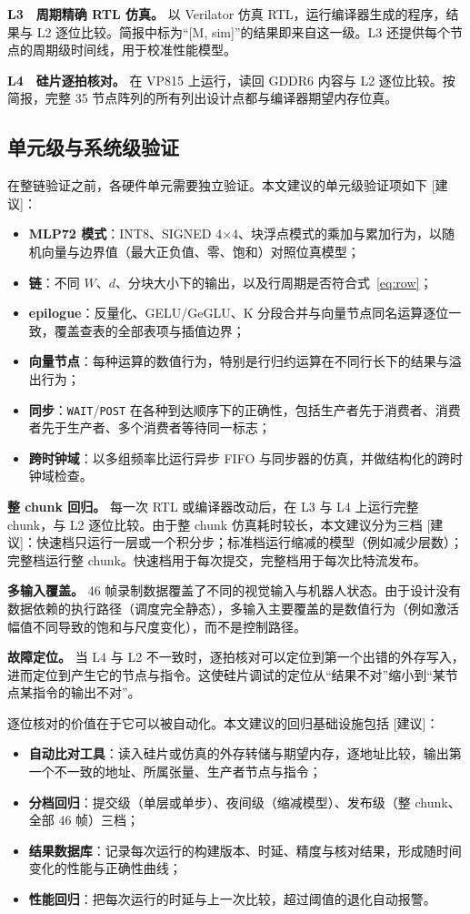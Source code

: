 \documentclass[a4paper,10.5pt]{ctexart}
\newcommand{\tR}{\textsf{[建议]}}           %
\begin{document}
\textbf{L3　周期精确 RTL 仿真。} 以 Verilator 仿真 RTL，运行编译器生成的程序，结果与 L2 逐位比较。简报中标为“[M, sim]”的结果即来自这一级。L3 还提供每个节点的周期级时间线，用于校准性能模型。

\textbf{L4　硅片逐拍核对。} 在 VP815 上运行，读回 GDDR6 内容与 L2 逐位比较。按简报，完整 35 节点阵列的所有列出设计点都与编译器期望内存位真。

\subsection{单元级与系统级验证}

在整链验证之前，各硬件单元需要独立验证。本文建议的单元级验证项如下 \tR：
\begin{itemize}
  \item \textbf{MLP72 模式}：INT8、SIGNED 4$\times$4、块浮点模式的乘加与累加行为，以随机向量与边界值（最大正负值、零、饱和）对照位真模型；
  \item \textbf{链}：不同 $W$、$d$、分块大小下的输出，以及行周期是否符合式~\eqref{eq:row}；
  \item \textbf{epilogue}：反量化、GELU/GeGLU、K 分段合并与向量节点同名运算逐位一致，覆盖查表的全部表项与插值边界；
  \item \textbf{向量节点}：每种运算的数值行为，特别是行归约运算在不同行长下的结果与溢出行为；
  \item \textbf{同步}：\texttt{WAIT}/\texttt{POST} 在各种到达顺序下的正确性，包括生产者先于消费者、消费者先于生产者、多个消费者等待同一标志；
  \item \textbf{跨时钟域}：以多组频率比运行异步 FIFO 与同步器的仿真，并做结构化的跨时钟域检查。
\end{itemize}

\textbf{整 chunk 回归。} 每一次 RTL 或编译器改动后，在 L3 与 L4 上运行完整 chunk，与 L2 逐位比较。由于整 chunk 仿真耗时较长，本文建议分为三档 \tR：快速档只运行一层或一个积分步；标准档运行缩减的模型（例如减少层数）；完整档运行整 chunk。快速档用于每次提交，完整档用于每次比特流发布。

\textbf{多输入覆盖。} 46 帧录制数据覆盖了不同的视觉输入与机器人状态。由于设计没有数据依赖的执行路径（调度完全静态），多输入主要覆盖的是数值行为（例如激活幅值不同导致的饱和与尺度变化），而不是控制路径。

\textbf{故障定位。} 当 L4 与 L2 不一致时，逐拍核对可以定位到第一个出错的外存写入，进而定位到产生它的节点与指令。这使硅片调试的定位从“结果不对”缩小到“某节点某指令的输出不对”。

逐位核对的价值在于它可以被自动化。本文建议的回归基础设施包括 \tR：
\begin{itemize}
  \item \textbf{自动比对工具}：读入硅片或仿真的外存转储与期望内存，逐地址比较，输出第一个不一致的地址、所属张量、生产者节点与指令；
  \item \textbf{分档回归}：提交级（单层或单步）、夜间级（缩减模型）、发布级（整 chunk、全部 46 帧）三档；
  \item \textbf{结果数据库}：记录每次运行的构建版本、时延、精度与核对结果，形成随时间变化的性能与正确性曲线；
  \item \textbf{性能回归}：把每次运行的时延与上一次比较，超过阈值的退化自动报警。
\end{itemize}
\end{document}
